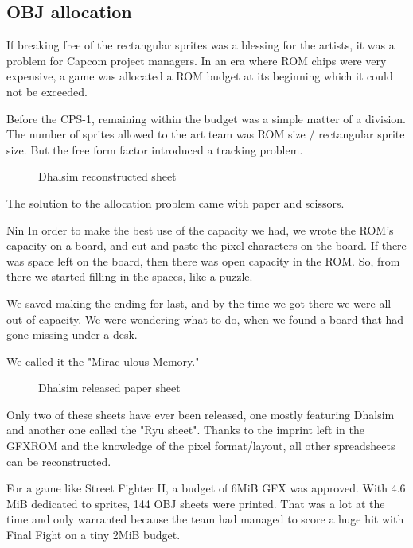 \subsection{OBJ allocation}

If breaking free of the rectangular sprites was a blessing for the artists, it was a problem for Capcom project managers. In an era where ROM chips were very expensive, a game was allocated a ROM budget at its beginning which it could not be exceeded.


Before the CPS-1, remaining within the budget was a simple matter of a division. The number of sprites allowed to the art team was ROM size / rectangular sprite size. But the free form factor introduced a tracking problem.



 \begin{figure}[H]
\caption*{Dhalsim reconstructed sheet}
\end{figure}

The solution to the allocation problem came with paper and scissors.

\begin{q}{Nin\cite{sf2devinterview}}
In order to make the best use of the capacity we had, we wrote the ROM’s capacity on a board, and cut and paste the pixel characters on the board. If there was space left on the board, then there was open capacity in the ROM. So, from there we started filling in the spaces, like a puzzle. 

We saved making the ending for last, and by the time we got there we were all out of capacity. We were wondering what to do, when we found a board that had gone missing under a desk.

We called it the "Mirac-ulous Memory."
\end{q}



 \begin{figure}[H]
\caption*{Dhalsim released paper sheet}
\end{figure}

Only two of these sheets have ever been released, one mostly featuring Dhalsim\cite{ffdevinterview} and another one called the "Ryu sheet"\cite{htmcc}. Thanks to the imprint left in the GFXROM and the knowledge of the pixel format/layout, all other spreadsheets can be reconstructed. 



For a game like Street Fighter II, a budget of 6MiB GFX was approved. With 4.6 MiB dedicated to sprites, 144 OBJ sheets were printed. That was a lot at the time and only warranted because the team had managed to score a huge hit with Final Fight on a tiny 2MiB budget\cite{gameMaestro4}. 




